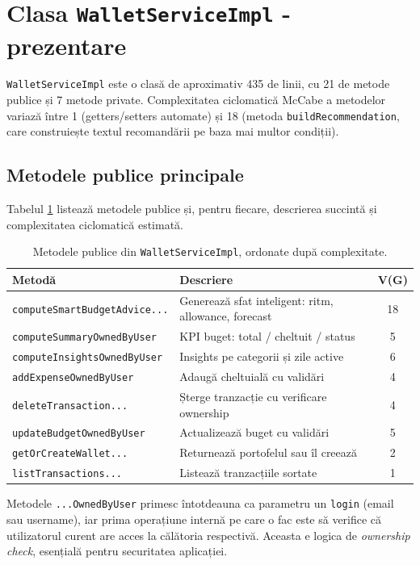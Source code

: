 \section{Clasa \texttt{WalletServiceImpl} - prezentare}

\texttt{WalletServiceImpl} este o clasă de aproximativ 435 de linii, cu 21 de metode publice și 7 metode private. Complexitatea ciclomatică McCabe a metodelor variază între 1 (getters/setters automate) și 18 (metoda \texttt{buildRecommendation}, care construiește textul recomandării pe baza mai multor condiții).

\subsection{Metodele publice principale}

Tabelul \ref{tab:methods} listează metodele publice și, pentru fiecare, descrierea succintă și complexitatea ciclomatică estimată.

\begin{table}[!htb]
\centering
\caption{Metodele publice din \texttt{WalletServiceImpl}, ordonate după complexitate.}
\label{tab:methods}
\begin{tabularx}{\linewidth}{lXc}
\toprule
\textbf{Metodă} & \textbf{Descriere} & \textbf{V(G)} \\
\midrule
\texttt{computeSmartBudgetAdvice...} & Generează sfat inteligent: ritm, allowance, forecast & 18 \\
\texttt{computeSummaryOwnedByUser} & KPI buget: total / cheltuit / status & 5 \\
\texttt{computeInsightsOwnedByUser} & Insights pe categorii și zile active & 6 \\
\texttt{addExpenseOwnedByUser} & Adaugă cheltuială cu validări & 4 \\
\texttt{deleteTransaction...} & Șterge tranzacție cu verificare ownership & 4 \\
\texttt{updateBudgetOwnedByUser} & Actualizează buget cu validări & 5 \\
\texttt{getOrCreateWallet...} & Returnează portofelul sau îl creează & 2 \\
\texttt{listTransactions...} & Listează tranzacțiile sortate & 1 \\
\bottomrule
\end{tabularx}
\end{table}

Metodele \texttt{...OwnedByUser} primesc întotdeauna ca parametru un \texttt{login} (email sau username), iar prima operațiune internă pe care o fac este să verifice că utilizatorul curent are acces la călătoria respectivă. Aceasta e logica de \textit{ownership check}, esențială pentru securitatea aplicației.

